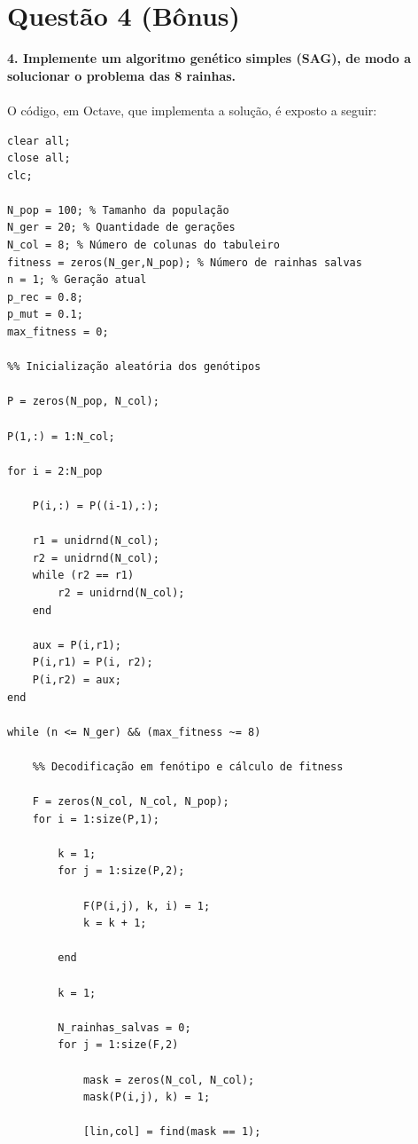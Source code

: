 \documentclass{report}
\begin{document}
	\section*{Questão 4 (Bônus)}
	
	\textbf{4. Implemente um algoritmo genético simples (SAG), de modo a solucionar o problema das 8 rainhas.}

	\paragraph{} O código, em Octave, que implementa a solução, é exposto a seguir:\\
	
	\begin{lstlisting}
clear all;
close all;
clc;

N_pop = 100; % Tamanho da população
N_ger = 20; % Quantidade de gerações
N_col = 8; % Número de colunas do tabuleiro
fitness = zeros(N_ger,N_pop); % Número de rainhas salvas
n = 1; % Geração atual
p_rec = 0.8;
p_mut = 0.1;
max_fitness = 0;

%% Inicialização aleatória dos genótipos

P = zeros(N_pop, N_col);

P(1,:) = 1:N_col;

for i = 2:N_pop

    P(i,:) = P((i-1),:);

    r1 = unidrnd(N_col);
    r2 = unidrnd(N_col);
    while (r2 == r1)
        r2 = unidrnd(N_col);
    end
    
    aux = P(i,r1);
    P(i,r1) = P(i, r2);
    P(i,r2) = aux;
end

while (n <= N_ger) && (max_fitness ~= 8)

    %% Decodificação em fenótipo e cálculo de fitness

    F = zeros(N_col, N_col, N_pop);
    for i = 1:size(P,1);

        k = 1;
        for j = 1:size(P,2);
            
            F(P(i,j), k, i) = 1;
            k = k + 1;
            
        end
        
        k = 1;

        N_rainhas_salvas = 0;
        for j = 1:size(F,2)

            mask = zeros(N_col, N_col);
            mask(P(i,j), k) = 1;
            
            [lin,col] = find(mask == 1);         
            

\end{lstlisting}
\end{document}
